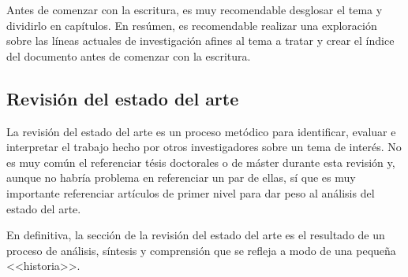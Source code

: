 Antes de comenzar con la escritura, es muy recomendable desglosar el tema y dividirlo en capítulos. En resúmen, es recomendable realizar una exploración sobre las líneas actuales de investigación afines al tema a tratar y crear el índice del documento antes de comenzar con la escritura.


\subsection{Revisión del estado del arte}
La revisión del estado del arte es un proceso metódico para identificar, evaluar e interpretar el trabajo hecho por otros investigadores sobre un tema de interés. No es muy común el referenciar tésis doctorales o de máster durante esta revisión y, aunque no habría problema en referenciar un par de ellas, sí que es muy importante referenciar artículos de primer nivel para dar peso al análisis del estado del arte.

En definitiva, la sección de la revisión del estado del arte es el resultado de un proceso de análisis, síntesis y comprensión que se refleja a modo de una pequeña <<historia>>.


